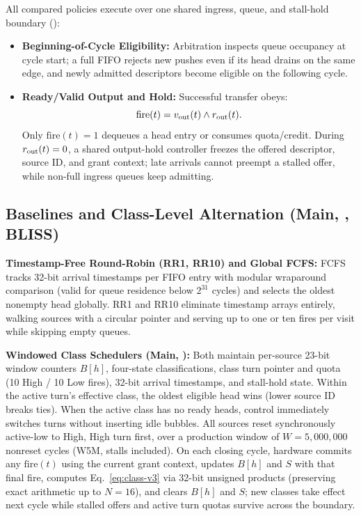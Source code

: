 All compared policies execute over one shared ingress, queue, and stall-hold boundary ():
\begin{itemize}
\item \textbf{Beginning-of-Cycle Eligibility:} Arbitration inspects queue occupancy at cycle start; a full FIFO rejects new pushes even if its head drains on the same edge, and newly admitted descriptors become eligible on the following cycle.
\item \textbf{Ready/Valid Output and Hold:} Successful transfer obeys:
\begin{equation}
\mathrm{fire}(t)=v_{\rm out}(t)\land r_{\rm out}(t).
\label{eq:fire-v3}
\end{equation}
Only $\mathrm{fire}(t)=1$ dequeues a head entry or consumes quota/credit. During $r_{\rm out}(t)=0$, a shared output-hold controller freezes the offered descriptor, source ID, and grant context; late arrivals cannot preempt a stalled offer, while non-full ingress queues keep admitting.
\end{itemize}

\subsection{Baselines and Class-Level Alternation (Main, \Alg{}, BLISS)}
\textbf{Timestamp-Free Round-Robin (RR1, RR10) and Global FCFS:} FCFS tracks 32-bit arrival timestamps per FIFO entry with modular wraparound comparison (valid for queue residence below $2^{31}$ cycles) and selects the oldest nonempty head globally. RR1 and RR10 eliminate timestamp arrays entirely, walking sources with a circular pointer and serving up to one or ten fires per visit while skipping empty queues.

\textbf{Windowed Class Schedulers (Main, \Alg{}):} Both maintain per-source 23-bit window counters $B[h]$, four-state classifications, class turn pointer and quota (10 High / 10 Low fires), 32-bit arrival timestamps, and stall-hold state. Within the active turn's effective class, the oldest eligible head wins (lower source ID breaks ties). When the active class has no ready heads, control immediately switches turns without inserting idle bubbles. All sources reset synchronously active-low to High, High turn first, over a production window of $W=5{,}000{,}000$ nonreset cycles (W5M, stalls included). On each closing cycle, hardware commits any $\mathrm{fire}(t)$ using the current grant context, updates $B[h]$ and $S$ with that final fire, computes Eq.~\eqref{eq:class-v3} via 32-bit unsigned products (preserving exact arithmetic up to $N=16$), and clears $B[h]$ and $S$; new classes take effect next cycle while stalled offers and active turn quotas survive across the boundary.

